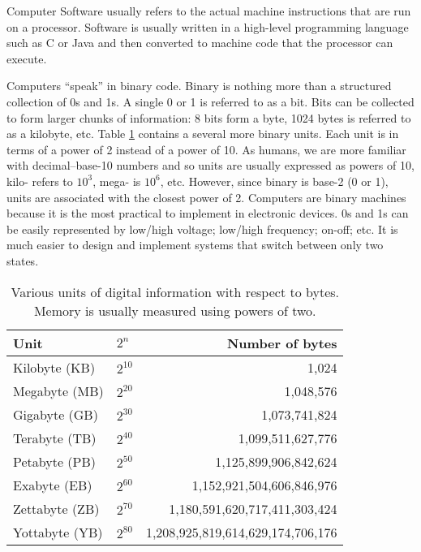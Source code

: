 Computer Software  usually refers to the actual machine instructions
that are run on a processor.  Software is usually written in a high-level
programming language such as C or Java and then converted to 
machine code that the processor can execute.

Computers ``speak'' in binary code.  Binary  is nothing more than a 
structured collection of 0s and 1s.  A single 0 or 1 is referred to as a \gls{bit}.  
Bits can be collected to form larger chunks of information: 8 bits form 
a \gls{byte}, 1024 bytes is referred to as a 
kilobyte, etc.  Table 
\ref{table:memoryUnits} contains a several more binary units.
Each unit is in terms of a power of 2 instead of a power of 10.  
As humans, we are more familiar with decimal--base-10 numbers
and so units are usually expressed as powers of 10, kilo- refers
to $10^3$, mega- is $10^6$, etc.  However, since binary is base-2
(0 or 1), units are associated with the closest power of 2.
Computers are binary machines because it is the most practical to
implement in electronic devices.  0s and 1s can be easily represented
by low/high voltage; low/high frequency; on-off; etc.  It is much easier
to design and implement systems that switch between only two states.

\begin{table}
\centering
\begin{tabular}{l|l|r}
Unit & $2^n$ & Number of bytes \\
\hline\hline
Kilobyte (KB) & $2^{10}$ & 1,024 \\
Megabyte (MB) & $2^{20}$ & 1,048,576 \\
Gigabyte (GB) & $2^{30}$ & 1,073,741,824 \\
Terabyte (TB) & $2^{40}$ & 1,099,511,627,776 \\
Petabyte (PB) & $2^{50}$ & 1,125,899,906,842,624 \\
Exabyte (EB) & $2^{60}$ &  1,152,921,504,606,846,976\\
Zettabyte (ZB) & $2^{70}$ &  1,180,591,620,717,411,303,424\\
Yottabyte (YB) & $2^{80}$ &  1,208,925,819,614,629,174,706,176\\
\end{tabular}
\caption[Memory Units]{Various units of digital information with 
respect to bytes.  Memory is usually measured using powers of two.}
\label{table:memoryUnits}
\end{table}

